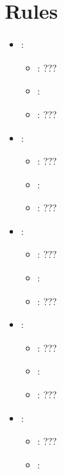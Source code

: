 \section{Rules}

\begin{itemize}
    \item {}:
           \begin{itemize}
                \item \optionPossibleValues{}: ???
                \item \optionDefaultValue{}: 
                \item \optionDescrption{}: ???
           \end{itemize}
    \item {}:
           \begin{itemize}
                \item \optionPossibleValues{}: ???
                \item \optionDefaultValue{}: 
                \item \optionDescrption{}: ???
           \end{itemize}
    \item {}:
           \begin{itemize}
                \item \optionPossibleValues{}: ???
                \item \optionDefaultValue{}: 
                \item \optionDescrption{}: ???
           \end{itemize}
    \item {}:
           \begin{itemize}
                \item \optionPossibleValues{}: ???
                \item \optionDefaultValue{}: 
                \item \optionDescrption{}: ???
           \end{itemize}
    \item {}:
           \begin{itemize}
                \item \optionPossibleValues{}: ???
                \item \optionDefaultValue{}: 

\end{itemize}
\end{itemize}
